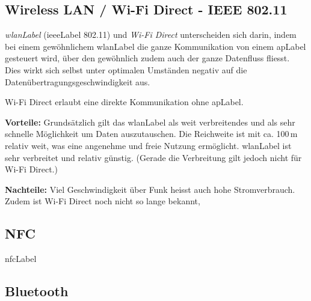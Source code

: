 \subsection{Wireless LAN / Wi-Fi Direct - IEEE 802.11}
\textit{\gls{wlanLabel}} (\gls{ieeeLabel} 802.11) und \textit{Wi-Fi Direct} unterscheiden sich darin, indem bei einem gewöhnlichem \gls{wlanLabel} die ganze Kommunikation von einem \gls{apLabel} gesteuert wird, über den gewöhnlich zudem auch der ganze Datenfluss fliesst. Dies wirkt sich selbst unter optimalen Umständen negativ auf die Datenübertragungsgeschwindigkeit aus.

Wi-Fi Direct erlaubt eine direkte Kommunikation ohne \gls{apLabel}.

\textbf{Vorteile:}
Grundsätzlich gilt das \gls{wlanLabel} als weit verbreitendes und als sehr schnelle Möglichkeit um Daten auszutauschen. Die Reichweite ist mit ca. 100\,m relativ weit, was eine angenehme und freie Nutzung ermöglicht.
\gls{wlanLabel} ist sehr verbreitet und relativ günstig. (Gerade die Verbreitung gilt jedoch nicht für Wi-Fi Direct.)

\textbf{Nachteile:}
Viel Geschwindigkeit über Funk heisst auch hohe Stromverbrauch. Zudem ist Wi-Fi Direct noch nicht so lange bekannt, 





\subsection{NFC}
\gls{nfcLabel}


\subsection{Bluetooth}

